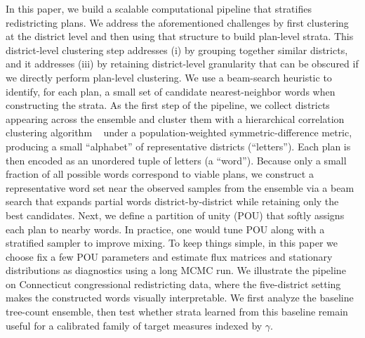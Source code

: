 In this paper, we build a scalable computational pipeline that stratifies redistricting plans. 
We address the aforementioned challenges by first clustering at the district level and then using that structure to build plan-level strata.
This district-level clustering step addresses (i) by grouping together similar districts, and it addresses (iii) by retaining district-level granularity that can be obscured if we directly perform plan-level clustering.
We use a beam-search heuristic to identify, for each plan, a small set of candidate nearest-neighbor words when constructing the strata.
As the first step of the pipeline, we collect districts appearing across the ensemble and cluster them with a hierarchical correlation clustering algorithm \hccultra~\cite{DBLP:journals/corr/abs-2409-01010} under a population-weighted symmetric-difference metric, producing a small ``alphabet'' of representative districts (``letters'').
Each plan is then encoded as an unordered tuple of letters (a ``word'').
Because only a small fraction of all possible words correspond to viable plans, we construct a representative word set near the observed samples from the ensemble via a beam search that expands partial words district-by-district while retaining only the best candidates.
Next, we define a partition of unity (POU) that softly assigns each plan to nearby words.
In practice, one would tune POU along with a stratified sampler to improve mixing.
To keep things simple, in this paper we choose fix a few POU parameters and estimate flux matrices and stationary distributions as diagnostics using a long MCMC run.
We illustrate the pipeline on Connecticut congressional redistricting data, where the five-district setting makes the constructed words visually interpretable.
We first analyze the baseline tree-count ensemble, then test whether strata learned from this baseline remain useful for a calibrated family of target measures indexed by $\gamma$.

